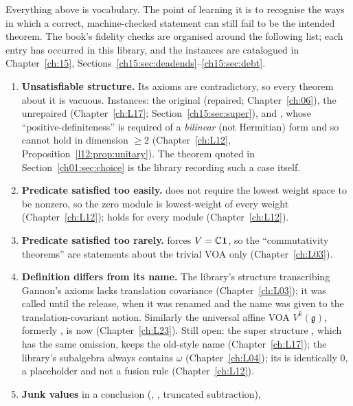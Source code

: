 Everything above is vocabulary. The point of learning it is to recognise the ways in which a
correct, machine-checked statement can still fail to be the intended theorem. The book's fidelity
checks are organised around the following list; each entry has occurred in this library, and the
instances are catalogued in Chapter~\ref{ch:15}, Sections~\ref{ch15:sec:deadends}--\ref{ch15:sec:debt}.
\begin{enumerate}[label=(F\arabic*)]
\item \textbf{Unsatisfiable structure.} Its axioms are contradictory, so every theorem about it is
  vacuous. Instances: the original  (repaired; Chapter~\ref{ch:06}), the
  unrepaired  (Chapter~\ref{ch:L17}; Section~\ref{ch15:sec:super}), and
  , whose ``positive-definiteness'' is required of a \emph{bilinear} (not
  Hermitian) form and so cannot hold in dimension $\ge2$ (Chapter~\ref{ch:L12},
  Proposition~\ref{l12:prop:unitary}). The  theorem quoted in
  Section~\ref{ch01:sec:choice} is the library recording such a case itself.
\item \textbf{Predicate satisfied too easily.}  does not require the
  lowest weight space to be nonzero, so the zero module is lowest-weight of every weight
  (Chapter~\ref{ch:L12});  holds for every module (Chapter~\ref{ch:L12}).
\item \textbf{Predicate satisfied too rarely.}  forces $V = {\mathbb{C}}\mathbf{1}$, so the
  ``commutativity theorems'' are statements about the trivial VOA only (Chapter~\ref{ch:L03}).
\item \textbf{Definition differs from its name.} The library's structure transcribing Gannon's axioms lacks
  translation covariance (Chapter~\ref{ch:L03}); it was called  until the release, when it was renamed
   and the name  was given to the translation-covariant notion. Similarly the
  universal affine VOA $V^k(\mathfrak g)$, formerly , is now 
  (Chapter~\ref{ch:L23}). Still open: the super structure , which has the same omission, keeps the old-style
  name (Chapter~\ref{ch:L17}); the library's  subalgebra always contains $\omega$
  (Chapter~\ref{ch:L04}); its  is identically $0$, a placeholder and not a fusion rule (Chapter~\ref{ch:L12}).
\item \textbf{Junk values} in a conclusion (, , truncated subtraction),

\end{enumerate}
